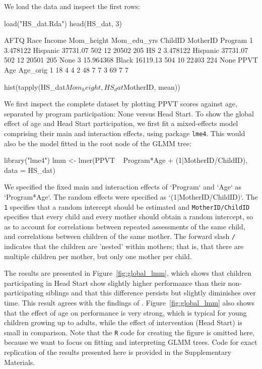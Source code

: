 \documentclass[doc,floatsintext,natbib]{apa7}
\begin{document}
We load the data and inspect the first rows:

\begin{Schunk}
\begin{Sinput}
 load("HS_dat.Rda")
 head(HS_dat, 3)
\end{Sinput}
\begin{Soutput}
       AFTQ     Race   Income Mom_height Mom_edu_yrs ChildID MotherID Program
1  3.478122 Hispanic 37731.07        502          12   20502      205      HS
2  3.478122 Hispanic 37731.07        502          12   20501      205    None
3 15.964368    Black 16119.13        504          10   22403      224    None
  PPVT Age Age_orig
1   18   4        4
2   48   7        7
3   69   7        7
\end{Soutput}
\begin{Sinput}
 hist(tapply(HS_dat$Mom_height, HS_dat$MotherID, mean))
\end{Sinput}
\end{Schunk}

We first inspect the complete dataset by plotting PPVT scores against age, separated by program participation: None versus Head Start. To show the global effect of age and Head Start participation, we first fit a mixed-effects model comprising their main and interaction effects, using package \texttt{lme4}. This would also be the model fitted in the root node of the GLMM tree:

\begin{Schunk}
\begin{Sinput}
 library("lme4")
 lmm <- lmer(PPVT ~ Program*Age + (1|MotherID/ChildID), data = HS_dat)
\end{Sinput}
\end{Schunk}

We specified the fixed main and interaction effects of `Program` and `Age` as `Program*Age`. The random effects were specified as `(1|MotherID/ChildID)`. The \texttt{1} specifies that a random intercept should be estimated and \texttt{MotherID/ChildID} specifies that every child and every mother should obtain a random intercept, so as to account for correlations between repeated assessments of the same child, and correlations between children of the same mother. The forward slash \texttt{/} indicates that the children are 'nested' within mothers; that is, that there are multiple children per mother, but only one mother per child.

The results are presented in Figure~\ref{fig:global_lmm}, which shows that children participating in Head Start show slightly higher performance than their non-participating siblings and that this difference persists but slightly diminishes over time. This result agrees with the findings of \cite{Demi09}. Figure~\ref{fig:global_lmm} also shows that the effect of age on performance is very strong, which is typical for young children growing up to adults, while the effect of intervention (Head Start) is small in comparison. Note that the \texttt{R} code for creating the figure is omitted here, because we want to focus on fitting and interpreting GLMM trees. Code for exact replication of the results presented here is provided in the Supplementary Materials. 
\end{document}
